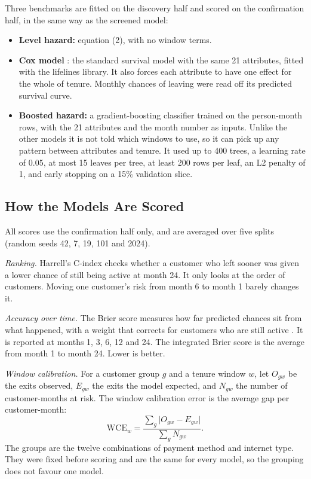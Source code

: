 \documentclass[conference]{IEEEtran}
\begin{document}
Three benchmarks are fitted on the discovery half and scored on the confirmation half, in the same way as the screened model:
\begin{itemize}
\item \textbf{Level hazard:} equation (2), with no window terms.
\item \textbf{Cox model} \cite{cox1972}: the standard survival model with the same 21 attributes, fitted with the lifelines library. It also forces each attribute to have one effect for the whole of tenure. Monthly chances of leaving were read off its predicted survival curve.
\item \textbf{Boosted hazard:} a gradient-boosting classifier trained on the person-month rows, with the 21 attributes and the month number as inputs. Unlike the other models it is not told which windows to use, so it can pick up any pattern between attributes and tenure. It used up to 400 trees, a learning rate of 0.05, at most 15 leaves per tree, at least 200 rows per leaf, an L2 penalty of 1, and early stopping on a 15\% validation slice.
\end{itemize}

\subsection{How the Models Are Scored}

All scores use the confirmation half only, and are averaged over five splits (random seeds 42, 7, 19, 101 and 2024).

\textit{Ranking.} Harrell's C-index checks whether a customer who left sooner was given a lower chance of still being active at month 24. It only looks at the order of customers. Moving one customer's risk from month 6 to month 1 barely changes it.

\textit{Accuracy over time.} The Brier score measures how far predicted chances sit from what happened, with a weight that corrects for customers who are still active \cite{graf1999}. It is reported at months 1, 3, 6, 12 and 24. The integrated Brier score is the average from month 1 to month 24. Lower is better.

\textit{Window calibration.} For a customer group $g$ and a tenure window $w$, let $O_{gw}$ be the exits observed, $E_{gw}$ the exits the model expected, and $N_{gw}$ the number of customer-months at risk. The window calibration error is the average gap per customer-month:
\begin{equation}
\mathrm{WCE}_w = \frac{\sum_g \lvert O_{gw} - E_{gw}\rvert}{\sum_g N_{gw}}.
\end{equation}
The groups are the twelve combinations of payment method and internet type. They were fixed before scoring and are the same for every model, so the grouping does not favour one model.
\end{document}
